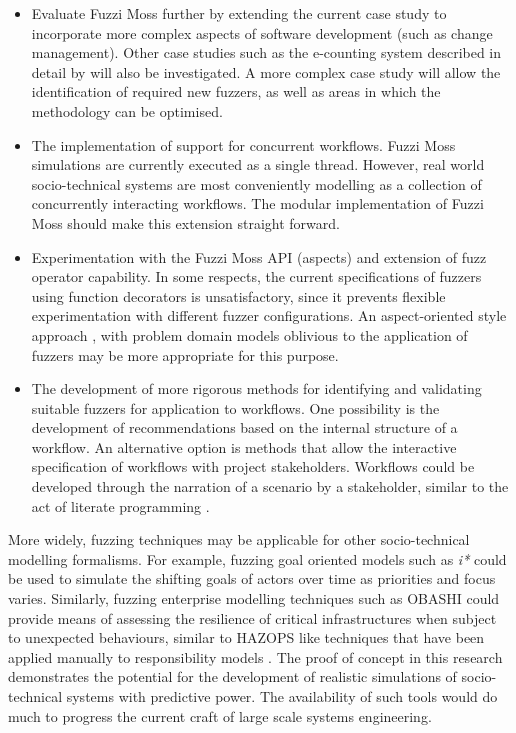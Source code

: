 \documentclass{sig-alternate}
\begin{document}
\begin{itemize}

\item Evaluate Fuzzi Moss further by extending the current case study to
  incorporate more complex aspects of software development (such as change
  management). Other case studies such as the e-counting system described in
  detail by \citet{lock07observations} will also be investigated.  A more
  complex case study will allow the identification of required new fuzzers, as
  well as areas in which the methodology can be optimised.

\item The implementation of support for concurrent workflows.  Fuzzi Moss
  simulations are currently executed as a single thread.  However, real world
  socio-technical systems are most conveniently modelling as a collection of
  concurrently interacting workflows.  The modular implementation of Fuzzi Moss
  should make this extension straight forward.

\item Experimentation with the Fuzzi Moss API (aspects) and extension of fuzz
  operator capability.  In some respects, the current specifications of fuzzers
  using function decorators is unsatisfactory, since it prevents flexible
  experimentation with different fuzzer configurations.  An aspect-oriented
  style approach \citep{filman01aspect}, with problem domain models oblivious to
  the application of fuzzers may be more appropriate for this purpose.

\item The development of more rigorous methods for identifying and validating
  suitable fuzzers for application to workflows.  One possibility is the
  development of recommendations based on the internal structure of a workflow.
  An alternative option is methods that allow the interactive specification of
  workflows with project stakeholders.  Workflows could be developed through the
  narration of a scenario by a stakeholder, similar to the act of literate
  programming \cite{knuth84literate}.

\end{itemize}

More widely, fuzzing techniques may be applicable for other socio-technical
modelling formalisms.  For example, fuzzing goal oriented models such as
\emph{i*} could be used to simulate the shifting goals of actors over time as
priorities and focus varies.  Similarly, fuzzing enterprise modelling techniques
such as OBASHI could provide means of assessing the resilience of critical
infrastructures when subject to unexpected behaviours, similar to HAZOPS like
techniques that have been applied manually to responsibility models
\cite{lock09modelling}. The proof of concept in this research demonstrates the
potential for the development of realistic simulations of socio-technical
systems with predictive power.  The availability of such tools would do much to
progress the current craft of large scale systems engineering.






\end{document}
